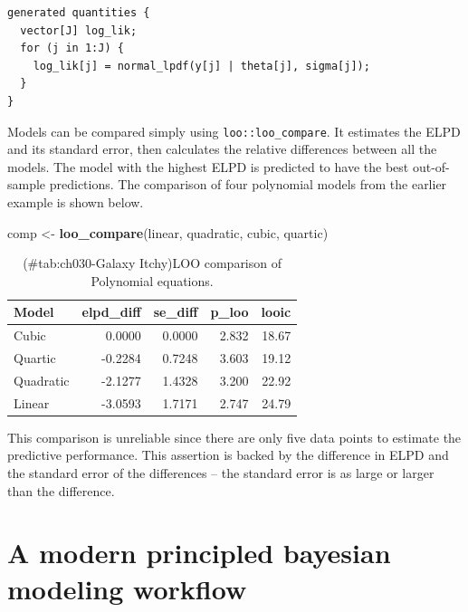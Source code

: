 \documentclass[11pt, oneside, openany]{scrbook}
\newenvironment{Shaded}{\begin{snugshade}}{\end{snugshade}}
\newcommand{\KeywordTok}[1]{\textcolor[rgb]{0.13,0.29,0.53}{\textbf{#1}}}
\newcommand{\NormalTok}[1]{#1}
\newcommand{\StringTok}[1]{\textcolor[rgb]{0.31,0.60,0.02}{#1}}
\begin{document}

\begin{verbatim}
generated quantities {
  vector[J] log_lik;
  for (j in 1:J) {
    log_lik[j] = normal_lpdf(y[j] | theta[j], sigma[j]);
  }
}
\end{verbatim}


Models can be compared simply using \texttt{loo::loo\_compare}. It estimates the ELPD and its standard error, then calculates the relative differences between all the models. The model with the highest ELPD is predicted to have the best out-of-sample predictions. The comparison of four polynomial models from the earlier example is shown below.

\begin{Shaded}
\begin{Highlighting}[]
\NormalTok{comp <-}\StringTok{ }\KeywordTok{loo_compare}\NormalTok{(linear, quadratic, cubic, quartic)}
\end{Highlighting}
\end{Shaded}

\begin{table}[!h]

\caption{(\#tab:ch030-Galaxy Itchy)LOO comparison of Polynomial equations.}
\centering
\begin{tabular}[t]{lrrrr}
\toprule
Model & elpd\_diff & se\_diff & p\_loo & looic\\
\midrule
Cubic & 0.0000 & 0.0000 & 2.832 & 18.67\\
Quartic & -0.2284 & 0.7248 & 3.603 & 19.12\\
Quadratic & -2.1277 & 1.4328 & 3.200 & 22.92\\
Linear & -3.0593 & 1.7171 & 2.747 & 24.79\\
\bottomrule
\end{tabular}
\end{table}

This comparison is unreliable since there are only five data points to estimate the predictive performance. This assertion is backed by the difference in ELPD and the standard error of the differences -- the standard error is as large or larger than the difference.

\hypertarget{a-modern-principled-bayesian-modeling-workflow}{%
\section{A modern principled bayesian modeling workflow}\label{a-modern-principled-bayesian-modeling-workflow}}
\end{document}
